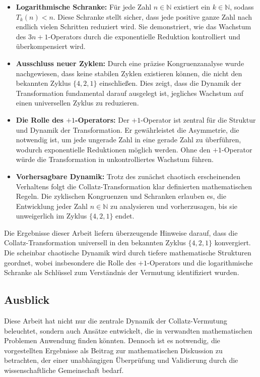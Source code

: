 \documentclass[a4paper,12pt]{article}
\begin{document}
\begin{itemize}
    \item \textbf{Logarithmische Schranke:} Für jede Zahl \( n \in \mathbb{N} \) existiert ein \( k \in \mathbb{N} \), sodass \( T_k(n) < n \). Diese Schranke stellt sicher, dass jede positive ganze Zahl nach endlich vielen Schritten reduziert wird. Sie demonstriert, wie das Wachstum des \( 3n+1 \)-Operators durch die exponentielle Reduktion kontrolliert und überkompensiert wird.
    \item \textbf{Ausschluss neuer Zyklen:} Durch eine präzise Kongruenzanalyse wurde nachgewiesen, dass keine stabilen Zyklen existieren können, die nicht den bekannten Zyklus \( \{4, 2, 1\} \) einschließen. Dies zeigt, dass die Dynamik der Transformation fundamental darauf ausgelegt ist, jegliches Wachstum auf einen universellen Zyklus zu reduzieren.
    \item \textbf{Die Rolle des \(+1\)-Operators:} Der \(+1\)-Operator ist zentral für die Struktur und Dynamik der Transformation. Er gewährleistet die Asymmetrie, die notwendig ist, um jede ungerade Zahl in eine gerade Zahl zu überführen, wodurch exponentielle Reduktionen möglich werden. Ohne den \(+1\)-Operator würde die Transformation in unkontrolliertes Wachstum führen.
    \item \textbf{Vorhersagbare Dynamik:} Trotz des zunächst chaotisch erscheinenden Verhaltens folgt die Collatz-Transformation klar definierten mathematischen Regeln. Die zyklischen Kongruenzen und Schranken erlauben es, die Entwicklung jeder Zahl \( n \in \mathbb{N} \) zu analysieren und vorherzusagen, bis sie unweigerlich im Zyklus \( \{4, 2, 1\} \) endet.
\end{itemize}

Die Ergebnisse dieser Arbeit liefern überzeugende Hinweise darauf, dass die Collatz-Transformation universell in den bekannten Zyklus \( \{4, 2, 1\} \) konvergiert. Die scheinbar chaotische Dynamik wird durch tiefere mathematische Strukturen geordnet, wobei insbesondere die Rolle des \(+1\)-Operators und die logarithmische Schranke als Schlüssel zum Verständnis der Vermutung identifiziert wurden.

\subsection*{Ausblick}
Diese Arbeit hat nicht nur die zentrale Dynamik der Collatz-Vermutung beleuchtet, sondern auch Ansätze entwickelt, die in verwandten mathematischen Problemen Anwendung finden könnten. Dennoch ist es notwendig, die vorgestellten Ergebnisse als Beitrag zur mathematischen Diskussion zu betrachten, der einer unabhängigen Überprüfung und Validierung durch die wissenschaftliche Gemeinschaft bedarf.
\end{document}
